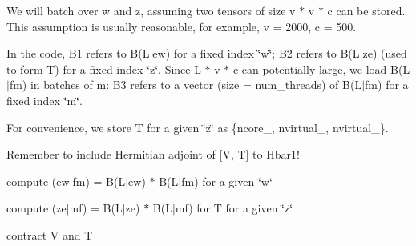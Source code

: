 \begin{DoxyEnumerate}
\item We will batch over w and z, assuming two tensors of size v $\ast$ v $\ast$ c can be stored. This assumption is usually reasonable, for example, v = 2000, c = 500.
\item In the code, B1 refers to B(L$\vert$ew) for a fixed index \char`\"{}w\char`\"{}; B2 refers to B(L$\vert$ze) (used to form T\textquotesingle{}\textquotesingle{}) for a fixed index \char`\"{}z\char`\"{}. Since L $\ast$ v $\ast$ c can potentially large, we load B(L$\vert$fm) in batches of m\+: B3 refers to a vector (size = num\+\_\+threads) of B(L$\vert$fm) for a fixed index \char`\"{}m\char`\"{}.
\item For convenience, we store T\textquotesingle{}\textquotesingle{} for a given \char`\"{}z\char`\"{} as \{ncore\+\_\+, nvirtual\+\_\+, nvirtual\+\_\+\}.
\item Remember to include Hermitian adjoint of \mbox{[}V, T\mbox{]} to Hbar1!
\end{DoxyEnumerate}

compute (ew$\vert$fm) = B(L$\vert$ew) $\ast$ B(L$\vert$fm) for a given \char`\"{}w\char`\"{}

compute (ze$\vert$mf) = B(L$\vert$ze) $\ast$ B(L$\vert$mf) for T for a given \char`\"{}z\char`\"{}

contract V and T \mbox{\label{classforte_1_1_t_h_r_e_e___d_s_r_g___m_r_p_t2_ad06666e1f7f43f146e32bee6fe9d4ab7}} 
